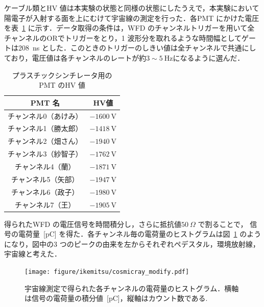 ケーブル類とHV 値は本実験の状態と同様の状態にしたうえで，本実験において陽電子が入射する面を上にむけて宇宙線の測定を行った．各PMT にかけた電圧を表~\ref{PS_PMT_HV} に示す．データ取得の条件は，WFD のチャンネルトリガーを用いて全チャンネルのORでトリガーをとり，1 波形分を取れるような時間幅としてゲートは208~ns とした．このときのトリガーのしきい値は全チャンネルで共通にしており，電圧値は各チャンネルのレートが約$3 \sim 5~\mathrm{Hz}$になるように選んだ．
\begin{table}[H]
\caption{プラスチックシンチレータ用のPMT のHV 値}
\label{PS_PMT_HV}
\centering
\begin{tabular}{cc}\toprule
PMT 名 & HV値 \\ \midrule
チャンネル0（あけみ）& $-1600~\mathrm{V}$ \\
チャンネル1（勝太郎）& $-1418~\mathrm{V}$ \\
チャンネル2（畑さん）& $-1940~\mathrm{V}$ \\
チャンネル3（紗智子）& $-1762~\mathrm{V}$ \\
チャンネル4（蘭）  & $-1871~\mathrm{V}$ \\
チャンネル5（矢部） & $-1947~\mathrm{V}$ \\
チャンネル6（政子） & $-1980~\mathrm{V}$ \\
チャンネル7（王）  & $-1905~\mathrm{V}$ \\ \bottomrule
\end{tabular} 
 \end{table}%

得られたWFD の電圧信号を時間積分し，さらに抵抗値$50~\Omega$ で割ることで，
信号の電荷量~[pC] を得た．各チャンネル毎の電荷量のヒストグラムは図~\ref{cosmicray} のようになり，図中の3 つのピークの由来を左からそれぞれペデスタル，環境放射線，宇宙線と考えた．
\begin{figure}[H]
\centering
\texttt{[image: figure/ikemitsu/cosmicray\_modify.pdf]}
\caption{宇宙線測定で得られた各チャンネルの電荷量のヒストグラム．横軸は信号の電荷量の積分値~[pC]，縦軸はカウント数である. }
\label{cosmicray}
\end{figure}%

